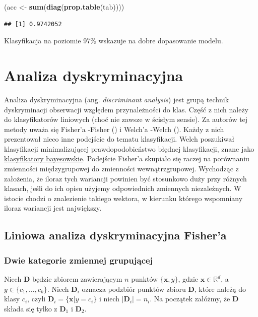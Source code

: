 \documentclass[
]{book}
\newenvironment{Shaded}{\begin{snugshade}}{\end{snugshade}}
\newcommand{\FunctionTok}[1]{\textcolor[rgb]{0.13,0.29,0.53}{\textbf{#1}}}
\newcommand{\NormalTok}[1]{#1}
\newcommand{\OtherTok}[1]{\textcolor[rgb]{0.56,0.35,0.01}{#1}}
\theoremstyle{plain}
\theoremstyle{definition}
\theoremstyle{definition}
\theoremstyle{definition}
\theoremstyle{definition}
\theoremstyle{definition}
\theoremstyle{remark}
\begin{document}
\begin{Shaded}
\begin{Highlighting}[]
\NormalTok{(acc }\OtherTok{\textless{}{-}} \FunctionTok{sum}\NormalTok{(}\FunctionTok{diag}\NormalTok{(}\FunctionTok{prop.table}\NormalTok{(tab))))}
\end{Highlighting}
\end{Shaded}

\begin{verbatim}
## [1] 0.9742052
\end{verbatim}

Klasyfikacja na poziomie 97\% wskazuje na dobre dopasowanie modelu.

\chapter{Analiza dyskryminacyjna}\label{LDA}

Analiza dyskryminacyjna (ang. \emph{discriminant analysis}) jest grupą technik dyskryminacji obserwacji względem przynależności do klas. Część z nich należy do klasyfikatorów liniowych (choć nie zawsze w ścisłym sensie). Za autorów tej metody uważa się Fisher'a -Fisher () i Welch'a -Welch (). Każdy z nich prezentował nieco inne podejście do tematu klasyfikacji. Welch poszukiwał klasyfikacji minimalizującej prawdopodobieństwo błędnej klasyfikacji, znane jako \hyperref[bayes]{klasyfikatory bayesowskie}. Podejście Fisher'a skupiało się raczej na porównaniu zmienności międzygrupowej do zmienności wewnątrzgrupowej. Wychodząc z założenia, że iloraz tych wariancji powinien być stosunkowo duży przy różnych klasach, jeśli do ich opisu użyjemy odpowiednich zmiennych niezależnych. W istocie chodzi o znalezienie takiego wektora, w kierunku którego wspomniany iloraz wariancji jest największy.

\section{Liniowa analiza dyskryminacyjna Fisher'a}\label{liniowa-analiza-dyskryminacyjna-fishera}

\subsection{Dwie kategorie zmiennej grupującej}\label{dwie-kategorie-zmiennej-grupujux105cej}

Niech \(\boldsymbol D\) będzie zbiorem zawierającym \(n\) punktów \(\{\boldsymbol x, y\}\), gdzie \(\boldsymbol x\in \mathbb{R}^d\), a \(y\in \{c_1,\ldots,c_k\}\). Niech \(\boldsymbol D_i\) oznacza podzbiór punktów zbioru \(\boldsymbol D\), które należą do klasy \(c_i\), czyli \(\boldsymbol D_i=\{\boldsymbol x|y=c_i\}\) i niech \(|\boldsymbol D_i|=n_i\). Na początek załóżmy, że \(\boldsymbol D\) składa się tylko z \(\boldsymbol D_1\) i \(\boldsymbol D_2\).
\end{document}
